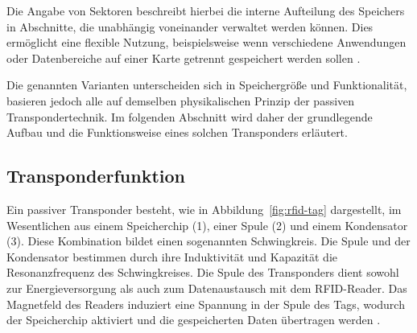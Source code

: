 Die Angabe von Sektoren beschreibt hierbei die interne Aufteilung des Speichers in Abschnitte, die unabhängig voneinander verwaltet werden können. 
Dies ermöglicht eine flexible Nutzung, beispielsweise wenn verschiedene Anwendungen oder Datenbereiche auf einer Karte getrennt gespeichert werden sollen \cite{NXP:2008}.

Die genannten Varianten unterscheiden sich in Speichergröße und Funktionalität, basieren jedoch alle auf demselben physikalischen Prinzip der passiven Transpondertechnik. 
Im folgenden Abschnitt wird daher der grundlegende Aufbau und die Funktionsweise eines solchen Transponders erläutert.



\subsection{Transponderfunktion}\label{subsec:transponderfunktion}

Ein passiver Transponder besteht, wie in Abbildung~\ref{fig:rfid-tag} dargestellt, im Wesentlichen aus einem Speicherchip (1), einer Spule (2) und einem Kondensator (3). 
Diese Kombination bildet einen sogenannten Schwingkreis. 
Die Spule und der Kondensator bestimmen durch ihre Induktivität und Kapazität die Resonanzfrequenz des Schwingkreises. 
Die Spule des Transponders dient sowohl zur Energieversorgung als auch zum Datenaustausch mit dem RFID-Reader. 
Das Magnetfeld des Readers induziert eine Spannung in der Spule des Tags, wodurch der Speicherchip aktiviert und die gespeicherten Daten übertragen werden \cite{Conrad:2024a} \cite{finkenzeller:2019}.





